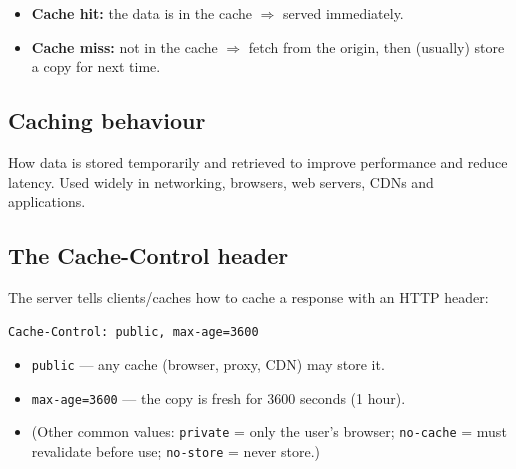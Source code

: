 \begin{itemize}
  \item \textbf{Cache hit:} the data is in the cache $\Rightarrow$ served immediately.
  \item \textbf{Cache miss:} not in the cache $\Rightarrow$ fetch from the origin, then (usually) store a copy for next time.
\end{itemize}

\begin{center}
\end{center}

\subsection{Caching behaviour}
How data is stored temporarily and retrieved to improve performance and reduce latency. Used widely in networking, browsers, web servers, CDNs and applications.

\subsection{The Cache-Control header}
The server tells clients/caches how to cache a response with an HTTP header:
\begin{lstlisting}
Cache-Control: public, max-age=3600
\end{lstlisting}
\begin{itemize}
  \item \texttt{public} --- any cache (browser, proxy, CDN) may store it.
  \item \texttt{max-age=3600} --- the copy is fresh for 3600 seconds (1 hour).
  \item (Other common values: \texttt{private} = only the user's browser; \texttt{no-cache} = must revalidate before use; \texttt{no-store} = never store.)
\end{itemize}

